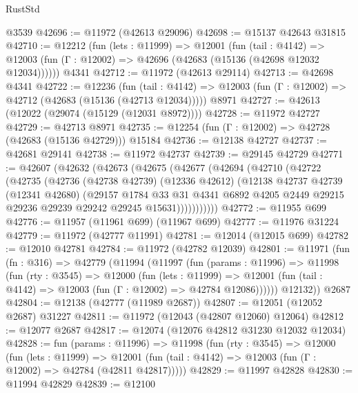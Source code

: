 \begin{lexlean}{RustStd}
\begin{coremodule}
    @3539
@42696 := @11972 (@42613 @29096)
@42698 := @15137 @42643 @31815
@42710 := @12212
    (fun (lets : @11999) =>
    @12001
      (fun (tail : @4142) =>
      @12003 (fun (Γ : @12002) => @42696 (@42683 (@15136 (@42698 @12032 @12034))))))
    @4341
@42712 := @11972 (@42613 @29114)
@42713 := @42698 @4341
@42722 := @12236
    (fun (tail : @4142) => @12003 (fun (Γ : @12002) => @42712 (@42683 (@15136 (@42713 @12034)))))
    @8971
@42727 := @42613 (@12022 (@29074 (@15129 (@12031 @8972))))
@42728 := @11972 @42727
@42729 := @42713 @8971
@42735 := @12254 (fun (Γ : @12002) => @42728 (@42683 (@15136 @42729))) @15184
@42736 := @12138 @42727
@42737 := @42681 @29141
@42738 := @11972 @42737
@42739 := @29145 @42729
@42771 := @42607
    (@42632
      (@42673
        (@42675
          (@42677
            (@42694
              (@42710
                (@42722
                  (@42735
                    (@42736
                      (@42738 @42739)
                      (@12336 @42612)
                      (@12138
                        @42737
                        @42739
                        (@12341 @42680)
                        (@29157
                          @1784
                          @33
                          @31
                          @4341
                          @6892
                          @4205
                          @2449
                          @29215
                          @29236
                          @29239
                          @29242
                          @29245
                          @15631)))))))))))
@42772 := @11955 @699
@42776 := @11957 (@11961 @699) (@11967 @699)
@42777 := @11976 @31224
@42779 := @11972 (@42777 @11991)
@42781 := @12014 (@12015 @699)
@42782 := @12010 @42781
@42784 := @11972 (@42782 @12039)
@42801 := @11971
    (fun (fn : @316) =>
    @42779
      (@11994
        (@11997
          (fun (params : @11996) =>
          @11998
            (fun (rty : @3545) =>
            @12000
              (fun (lets : @11999) =>
              @12001 (fun (tail : @4142) => @12003 (fun (Γ : @12002) => @42784 @12086))))))
        @12132))
    @2687
@42804 := @12138 (@42777 (@11989 @2687))
@42807 := @12051 (@12052 @2687) @31227
@42811 := @11972 (@12043 (@42807 @12060) @12064)
@42812 := @12077 @2687
@42817 := @12074 (@12076 @42812 @31230 @12032 @12034)
@42828 := fun (params : @11996) =>
  @11998
    (fun (rty : @3545) =>
    @12000
      (fun (lets : @11999) =>
      @12001 (fun (tail : @4142) => @12003 (fun (Γ : @12002) => @42784 (@42811 @42817)))))
@42829 := @11997 @42828
@42830 := @11994 @42829
@42839 := @12100

\end{coremodule}
\end{lexlean}
